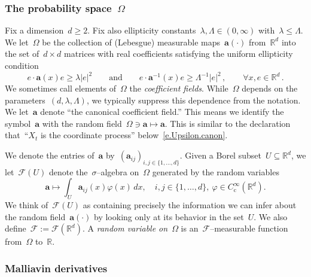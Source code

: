 \documentclass[11pt,twoside]{article} %
\numberwithin{equation}{section}
\theoremstyle{definition}
\newcommand*{\R}{\ensuremath{\mathbb{R}}}
\newcommand*{\Rd}{\ensuremath{\mathbb{R}^d}}
\renewcommand{\a}{\mathbf{a}}
\newcommand{\F}{\mathcal{F}}
\begin{document}
\subsubsection{The probability space~$\Omega$}
\label{ss.probspace} 

Fix a dimension~$d\geq 2$. Fix also ellipticity constants~$\lambda,\Lambda \in (0,\infty)$ with~$\lambda\leq \Lambda$. We let~$\Omega$ be the collection of (Lebesgue) measurable maps~$\a(\cdot)$ from~$\Rd$ into the set of~$d\times d$ matrices with real coefficients satisfying
the uniform ellipticity condition
\begin{equation} 
\label{e.ellipticity}
e \cdot \a(x) e \geq \lambda |e|^2 
\qquad \mbox{and} \qquad 
e \cdot \a^{-1}(x) e \geq \Lambda^{-1} |e|^2 \,,
\qquad \forall x,e\in\Rd
\,. 
\end{equation}
We sometimes call elements of~$\Omega$ the \emph{coefficient fields}. 
While~$\Omega$ depends on the parameters~$(d,\lambda,\Lambda)$, we typically suppress this dependence from the notation. 
We let~$\a$ denote ``the canonical coefficient field.'' This means we identify the symbol~$\a$ with the random field~$\Omega \ni \a \mapsto \a$. This is similar to the declaration that~``$X_t$ is the coordinate process'' below~\eqref{e.Upsilon.canon}. 

\smallskip

We denote the entries of~$\a$ by~$(\a_{ij})_{i,j\in\{1,\ldots,d\}}$. Given a Borel subset~$U\subseteq \Rd$, we let~$\F(U)$ denote the~$\sigma$--algebra on~$\Omega$ generated by the random variables 
\begin{equation} 
\label{e.FU}
\a \mapsto \int_U \a_{ij} (x) \varphi(x)\,dx, 
\quad 
i,j \in\{1,\ldots,d\}, 
\ 
\varphi\in C^\infty_{\mathrm{c}}(\Rd). 
\end{equation}
We think of~$\F(U)$ as containing precisely the information we can infer about the random field~$\a(\cdot)$ by looking only at its behavior in the set~$U$. We also define~$\F:=\F(\Rd)$. A \emph{random variable on}~$\Omega$ is an~$\F$--measurable function from~$\Omega$ to~$\R$. 



\subsubsection{Malliavin derivatives}
\end{document}
